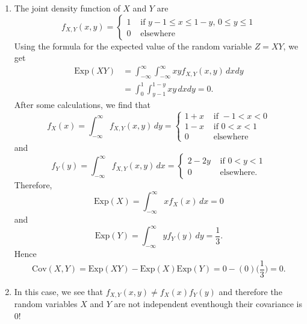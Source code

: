 \begin{sol*}
    \begin{enumerate}[label=\alph*)]
        \item The joint density function of $X$ and $Y$ are
            \[
                f_{X, Y} (x, y) = \left\{ \begin{matrix} 1 & \text{ if } y-1 \leq x \leq 1 - y , \, 0 \leq y \leq 1 \\ 
                0 & \text{ elsewhere} \end{matrix} \right. 
            \]
        Using the formula for the expected value of the random variable $Z = XY$, we get
            \begin{align*}
                \mathrm{Exp} (XY) &= \int_{-\infty}^\infty \int_{-\infty}^\infty xy f_{X, Y} (x, y) \, dx dy \\ 
                &= \int_{0}^1 \int_{y-1}^{1-y} xy \, dxdy = 0 .
            \end{align*}
        After some calculations, we find that
            \[
                f_X (x) = \int_{-\infty}^\infty f_{X, Y} (x, y) \, dy = \left\lbrace \begin{matrix} 1 + x & \text{ if } -1 < x < 0 \\
                1 - x & \text{ if } 0 < x < 1 \\ 
                0 & \text{ elsewhere}
                \end{matrix} \right. 
            \]
        and
            \[
                f_Y (y) = \int_{-\infty}^\infty f_{X, Y} (x, y) \, dx = \left\lbrace \begin{matrix} 2 - 2y & \text{ if } 0 < y < 1 \\ 
                0 & \text{ elsewhere.} 
                \end{matrix} \right. 
            \]
        Therefore,
            \[
                \mathrm{Exp} (X) = \int_{-\infty}^\infty x f_{X} (x) \, dx = 0
            \]
        and
            \[
                \mathrm{Exp} (Y) = \int_{-\infty}^\infty y f_Y (y) \, dy = \frac{1}{3} .
            \]
        Hence
            \[
                \mathrm{Cov} (X, Y) = \mathrm{Exp} (XY) - \mathrm{Exp} (X) \mathrm{Exp} (Y) = 0 - ( 0) \Big( \frac{1}{3} \Big) = 0 .
            \]
        \item In this case, we see that $f_{X, Y} (x, y) \neq f_X (x) f_Y (y)$ and therefore the random variables $X$ and $Y$ are not independent eventhough their covariance is $0$!
    \end{enumerate}
\end{sol*}

